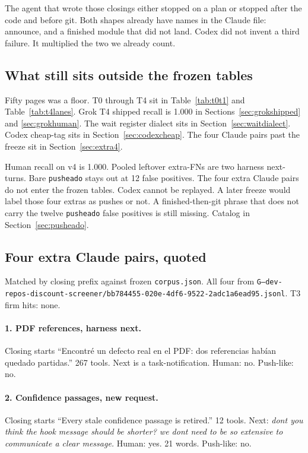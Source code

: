 The agent that wrote those closings either stopped on a plan or
stopped after the code and before git. Both shapes already have
names in the Claude file: announce, and a finished module that did
not land. Codex did not invent a third failure. It multiplied the
two we already count.

\subsection{What still sits outside the frozen tables}
\label{app:fifty}

Fifty pages was a floor. T0 through T4 sit in Table~\ref{tab:t0t1}
and Table~\ref{tab:t4lanes}. Grok T4 shipped recall is 1.000 in
Sections~\ref{sec:grokshipped} and \ref{sec:grokhuman}. The wait
register dialect sits in Section~\ref{sec:waitdialect}. Codex
cheap-tag sits in Section~\ref{sec:codexcheap}. The four Claude
pairs past the freeze sit in Section~\ref{sec:extra4}.

Human recall on v4 is 1.000. Pooled leftover extra-FNs are two
harness next-turns. Bare \texttt{pusheado} stays out at 12 false
positives. The four extra Claude pairs do not enter the frozen
tables. Codex cannot be replayed. A later freeze would label those
four extras as pushes or not. A finished-then-git phrase that does
not carry the twelve \texttt{pusheado} false positives is still
missing. Catalog in Section~\ref{sec:pusheado}.


\subsection{Four extra Claude pairs, quoted}
\label{app:extra4}

Matched by closing prefix against frozen \texttt{corpus.json}. All
four from
\texttt{G--dev-repos-discount-screener/bb784455-020e-4df6-9522-2adc1a6ead95.jsonl}.
T3 firm hits: none.

\paragraph{1. PDF references, harness next.}
Closing starts ``Encontr\'e un defecto real en el PDF: dos
referencias hab\'ian quedado partidas.'' 267 tools. Next is a
task-notification. Human: no. Push-like: no.

\paragraph{2. Confidence passages, new request.}
Closing starts ``Every stale confidence passage is retired.'' 12
tools. Next: \emph{dont you think the hook message should be
shorter? we dont need to be so extensive to communicate a clear
message.} Human: yes. 21 words. Push-like: no.


